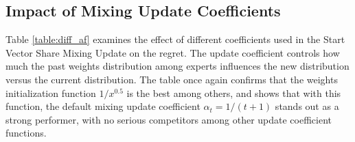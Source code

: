 \documentclass[12pt, twoside]{article}
\begin{document}
\newpage


\subsection{Impact of Mixing Update Coefficients}

Table \ref{table:diff_af} examines the effect of different coefficients used in the Start Vector Share Mixing Update on the regret. 
The update coefficient controls how much the past weights distribution among experts influences the new distribution versus the current distribution. The table once again confirms that the weights initialization function $1/x^{0.5}$ is the best among others, and shows that with this function, 
the default mixing update coefficient $\alpha_t = 1 / (t + 1)$ stands out as a strong performer, with no serious competitors among other update coefficient functions. 
\end{document}
